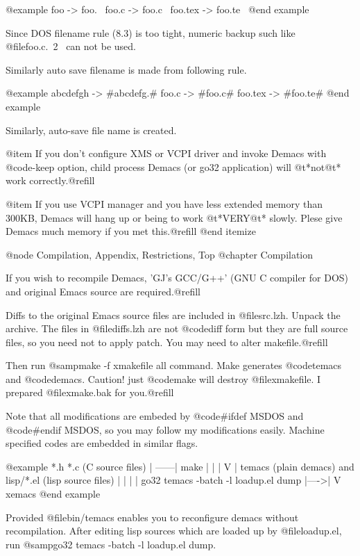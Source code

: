 @example
foo      ->  foo.~
foo.c    ->  foo.c~
foo.tex  ->  foo.te~
@end example

Since DOS filename rule (8.3) is too tight, numeric backup such like
@file{foo.c.~2~} can not be used.

Similarly auto save filename is made from following rule.

@example
abcdefgh ->  #abcdefg.#
foo.c    ->  #foo.c#
foo.tex  ->  #foo.te#
@end example

Similarly, auto-save file name is created.

@item
If you don't configure XMS or VCPI driver and invoke Demacs with
@code{-keep} option, child process Demacs (or go32 application) will
@t{*}not@t{*} work correctly.@refill

@item
If you use VCPI manager and you have less extended memory than 300KB,
Demacs will hang up or being to work @t{*}VERY@t{*} slowly. Plese give
Demacs much memory if you met this.@refill
@end itemize


@node Compilation, Appendix, Restrictions, Top
@chapter Compilation

If you wish to recompile Demacs, 'GJ's GCC/G++' (GNU C compiler for DOS)
and original Emacs source are required.@refill

Diffs to the original Emacs source files are included in
@file{src\diffs.lzh}. Unpack the archive. The files in @file{diffs.lzh}
are not @code{diff} form but they are full source files, so you need not to
apply patch.  You may need to alter makefile.@refill

Then run @samp{make -f xmakefile all} command. Make generates
@code{temacs} and @code{demacs}.  Caution! just @code{make} will destroy
@file{xmakefile}. I prepared @file{xmake.bak} for you.@refill

Note that all modifications are embeded by @code{#ifdef MSDOS} and
@code{#endif MSDOS}, so you may follow my modifications easily. Machine
specified codes are embedded in similar flags.

@example
    *.h *.c (C source files)
       |
 ------| make
 |     | 
 |     V
 |   temacs (plain demacs) and lisp/*.el (lisp source files)
 |     | 
 |     | go32 temacs -batch -l loadup.el dump
 |---->|
       V
     xemacs
@end example

Provided @file{bin/temacs} enables you to reconfigure demacs without
recompilation. After editing lisp sources which are loaded up by
@file{loadup.el}, run @samp{go32 temacs -batch -l loadup.el dump}.


